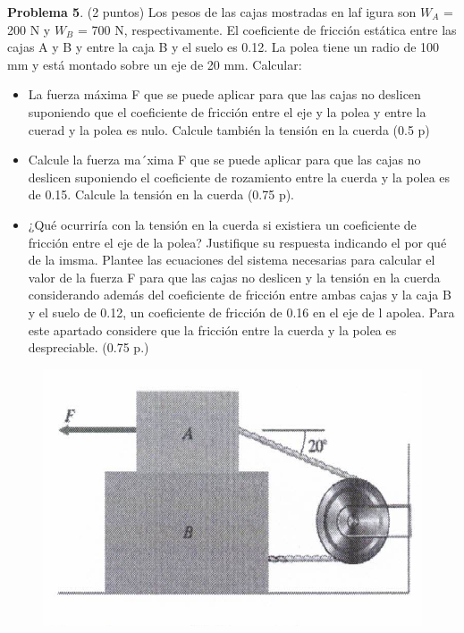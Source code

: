\documentclass[10pt]{article}
\begin{document}
\textbf{Problema 5}. (2 puntos) Los pesos de las cajas mostradas en laf igura son $W _{A}$ = 200 N y $ W _{B}$ = 700 N, respectivamente. El coeficiente de fricción estática entre las cajas A y B y entre la caja B y el suelo es 0.12. La polea tiene un radio de 100 mm y está montado sobre un eje de 20 mm. Calcular:
\begin{itemize}
    \item La fuerza máxima F que se puede aplicar para que las cajas no deslicen suponiendo que el coeficiente de fricción entre el eje y la polea y entre la cuerad y la polea es nulo. Calcule también la tensión en la cuerda (0.5 p)
    \item Calcule la fuerza ma´xima F que se puede aplicar para que las cajas no deslicen suponiendo el coeficiente de rozamiento entre la cuerda y la polea es de 0.15. Calcule la tensión en la cuerda (0.75 p).
    \item ¿Qué ocurriría con la tensión en la cuerda si existiera un coeficiente de fricción entre el eje de la polea? Justifique su respuesta indicando el por qué de la imsma. Plantee las ecuaciones del sistema necesarias para calcular el valor de la fuerza F para que las cajas no deslicen y la tensión en la cuerda considerando además del coeficiente de fricción entre ambas cajas y la caja B y el suelo de 0.12, un coeficiente de fricción de 0.16 en el eje de l apolea. Para este apartado considere que la fricción entre la cuerda y la polea es despreciable. (0.75 p.)
\end{itemize}
\begin{figure}[h!]
  \centering
  \includegraphics[width=0.45\linewidth]{problema_5.pdf}
  \label{fig:}
\end{figure}
\end{document}
